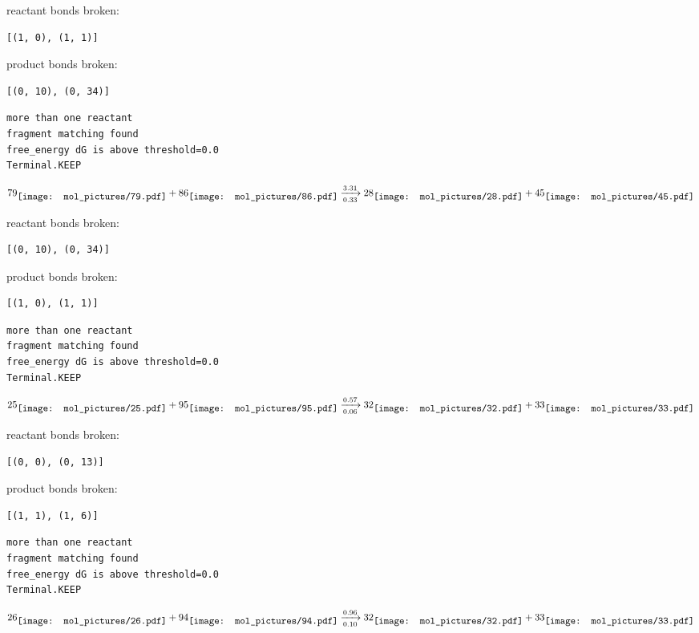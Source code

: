 \documentclass{article}
\begin{document}
reactant bonds broken:\begin{verbatim}
[(1, 0), (1, 1)]
\end{verbatim}
product bonds broken:\begin{verbatim}
[(0, 10), (0, 34)]
\end{verbatim}




\vspace{1cm}
\begin{verbatim}
more than one reactant
fragment matching found
free_energy dG is above threshold=0.0
Terminal.KEEP
\end{verbatim}
$$
79
\raisebox{-.5\height}{\texttt{[image: mol\_pictures/79.pdf]}}
+
86
\raisebox{-.5\height}{\texttt{[image: mol\_pictures/86.pdf]}}
\xrightarrow[0.33]{3.31}
28
\raisebox{-.5\height}{\texttt{[image: mol\_pictures/28.pdf]}}
+
45
\raisebox{-.5\height}{\texttt{[image: mol\_pictures/45.pdf]}}
$$


reactant bonds broken:\begin{verbatim}
[(0, 10), (0, 34)]
\end{verbatim}
product bonds broken:\begin{verbatim}
[(1, 0), (1, 1)]
\end{verbatim}




\vspace{1cm}
\begin{verbatim}
more than one reactant
fragment matching found
free_energy dG is above threshold=0.0
Terminal.KEEP
\end{verbatim}
$$
25
\raisebox{-.5\height}{\texttt{[image: mol\_pictures/25.pdf]}}
+
95
\raisebox{-.5\height}{\texttt{[image: mol\_pictures/95.pdf]}}
\xrightarrow[0.06]{0.57}
32
\raisebox{-.5\height}{\texttt{[image: mol\_pictures/32.pdf]}}
+
33
\raisebox{-.5\height}{\texttt{[image: mol\_pictures/33.pdf]}}
$$


reactant bonds broken:\begin{verbatim}
[(0, 0), (0, 13)]
\end{verbatim}
product bonds broken:\begin{verbatim}
[(1, 1), (1, 6)]
\end{verbatim}




\vspace{1cm}
\begin{verbatim}
more than one reactant
fragment matching found
free_energy dG is above threshold=0.0
Terminal.KEEP
\end{verbatim}
$$
26
\raisebox{-.5\height}{\texttt{[image: mol\_pictures/26.pdf]}}
+
94
\raisebox{-.5\height}{\texttt{[image: mol\_pictures/94.pdf]}}
\xrightarrow[0.10]{0.96}
32
\raisebox{-.5\height}{\texttt{[image: mol\_pictures/32.pdf]}}
+
33
\raisebox{-.5\height}{\texttt{[image: mol\_pictures/33.pdf]}}
$$
\end{document}
